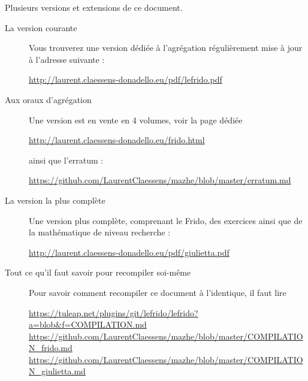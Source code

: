 
\thispagestyle{empty}

Plusieurs versions et extensions de ce document.
\begin{description}

    \item[La version courante]

        Vous trouverez une version dédiée à l'agrégation régulièrement mise à jour à l'adresse suivante :
        \begin{center}
            \url{http://laurent.claessens-donadello.eu/pdf/lefrido.pdf}
        \end{center}

    \item[Aux oraux d'agrégation]

        Une version est en vente en 4 volumes, voir la page dédiée
        \begin{center}
            \url{http://laurent.claessens-donadello.eu/frido.html}
        \end{center}
        ainsi que l'erratum :
        \begin{center}
            \url{https://github.com/LaurentClaessens/mazhe/blob/master/erratum.md}
        \end{center}

    \item[La version la plus complète]

        Une version plus complète, comprenant le Frido, des exercices ainsi que de la mathématique de niveau recherche :
        \begin{center}
            \url{http://laurent.claessens-donadello.eu/pdf/giulietta.pdf}
        \end{center}

    \item[Tout ce qu'il faut savoir pour recompiler soi-même]
        Pour savoir comment recompiler ce document à l'identique, il faut lire
        \begin{center}
            \url{https://tuleap.net/plugins/git/lefrido/lefrido?a=blob&f=COMPILATION.md}\\
            \url{https://github.com/LaurentClaessens/mazhe/blob/master/COMPILATION_frido.md}
            \url{https://github.com/LaurentClaessens/mazhe/blob/master/COMPILATION_giulietta.md}
        \end{center}

\end{description}
